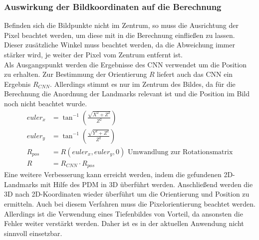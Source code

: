 \subsubsection{Auswirkung der Bildkoordinaten auf die Berechnung}
Befinden sich die Bildpunkte nicht im Zentrum, so muss die Ausrichtung der Pixel beachtet werden, um diese mit in die Berechnung einfließen zu lassen. Dieser zusätzliche Winkel muss beachtet werden, da die Abweichung immer stärker wird, je weiter der Pixel vom Zentrum entfernt ist.\\ 
Als Ausgangspunkt werden die Ergebnisse des CNN verwendet um die Position zu erhalten. Zur Bestimmung der Orientierung $R$ liefert auch das CNN ein Ergebnis $R_{CNN}$. Allerdings stimmt es nur im Zentrum des Bildes, da für die Berechnung die Anordnung der Landmarks relevant ist und die Position im Bild noch nicht beachtet wurde.\\
\begin{align*}
euler_x &= \tan^{-1}(\frac{\sqrt{X^2+Z^2}}{Z^2})\\
euler_y &= \tan^{-1}(\frac{\sqrt{Y^2+Z^2}}{Z^2})\\
R_{pos} &= R(euler_x,euler_y,0)\text{ Umwandlung zur Rotationsmatrix}\\
R &= R_{CNN}\cdot R_{pos}
\end{align*}
Eine weitere Verbesserung kann erreicht werden, indem die gefundenen 2D-Landmarks mit Hilfe des PDM in 3D überführt werden. Anschließend werden die 3D nach 2D-Koordinaten wieder überführt um die Orientierung und Position zu ermitteln. Auch bei diesem Verfahren muss die Pixelorientierung beachtet werden. Allerdings ist die Verwendung eines Tiefenbildes von Vorteil, da ansonsten die Fehler weiter verstärkt werden. Daher ist es in der aktuellen Anwendung nicht sinnvoll einsetzbar.\cite{OpenFace}
